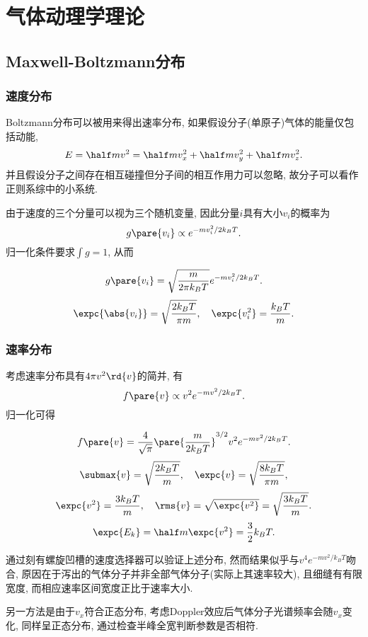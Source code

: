 \documentclass[../Thermal.tex]{subfiles}
\begin{document}
\section{气体动理学理论}
\subsection{Maxwell-Boltzmann分布}
\subsubsection{速度分布}
Boltzmann分布可以被用来得出速率分布, 如果假设分子(单原子)气体的能量仅包括动能,
\[ E= \half mv^2 = \half mv_x^2 + \half mv_y^2 + \half mv_z^2. \]
并且假设分子之间存在相互碰撞但分子间的相互作用力可以忽略, 故分子可以看作正则系综中的小系统.
\par
由于速度的三个分量可以视为三个随机变量, 因此分量$i$具有大小$v_i$的概率为
\[ g\pare{v_i} \propto e^{-mv_i^2/2k_BT}. \]
归一化条件要求$\int g = 1$, 从而
\begin{finale}
\[ g\pare{v_i} = \sqrt{\frac{m}{2\pi k_B T}} e^{-mv_i^2/2k_BT}. \]
\[ \expc{\abs{v_i}} = \sqrt{\frac{2k_BT}{\pi m}},\quad \expc{v_i^2} = \frac{k_BT}{m}. \]
\end{finale}
\subsubsection{速率分布}
考虑速率分布具有$4\pi v^2\rd{v}$的简并, 有
\[ f\pare{v} \propto v^2 e^{-mv^2/2k_BT}. \]
归一化可得
\begin{finale}
\[ f\pare{v} = \frac{4}{\sqrt{\pi}}\pare{\frac{m}{2k_BT}}^{3/2}v^2e^{-mv^2/2k_BT}. \]
\[ \submax{v} = \sqrt{\frac{2k_BT}{m}},\quad \expc{v} = \sqrt{\frac{8k_BT}{\pi m}}, \]
\[ \expc{v^2} = \frac{3k_BT}{m}, \quad \rms{v} = \sqrt{\expc{v^2}} = \sqrt{\frac{3k_BT}{m}}. \]
\begin{equation}
  \label{eq:EktoT}
  \expc{E_k} = \half m\expc{v^2} = \frac{3}{2}k_BT.
\end{equation}
\end{finale}
\begin{ex}
通过刻有螺旋凹槽的速度选择器可以验证上述分布, 然而结果似乎与$v^4e^{-mv^2/k_BT}$吻合, 原因在于泻出的气体分子并非全部气体分子(实际上其速率较大), 且细缝有有限宽度, 而相应速率区间宽度正比于速率大小.
\end{ex}
\begin{ex}
另一方法是由于$v_x$符合正态分布, 考虑Doppler效应后气体分子光谱频率会随$v_x$变化, 同样呈正态分布, 通过检查半峰全宽判断参数是否相符.
\end{ex}
\end{document}
